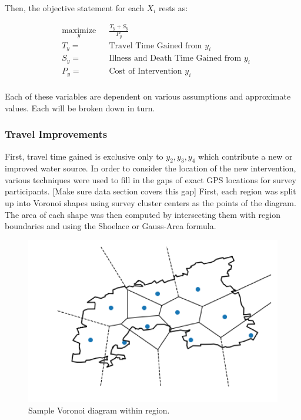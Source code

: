 Then, the objective statement for each $X_i$ rests as: %

\begin{equation}
\begin{aligned}
& \underset{y}{\text{maximize}}
& & \frac{T_y + S_y}{P_y}  \\
& T_y =
& & \text{Travel Time Gained from } y_i \\
& S_y =
& & \text{Illness and Death Time Gained from } y_i \\
& P_y =
& & \text{Cost of Intervention } y_i \\
\end{aligned}
\end{equation}

Each of these variables are dependent on various assumptions and approximate values.
Each will be broken down in turn.

\subsubsection*{Travel Improvements}
First, travel time gained is exclusive only to $y_2,y_3,y_4$ which contribute a new or improved water source.
In order to consider the location of the new intervention, various techniques were used to fill in the gaps of exact GPS locations for survey participants.
[Make sure data section covers this gap]
First, each region was split up into Voronoi shapes using survey cluster centers as the points of the diagram. %
The area of each shape was then computed by intersecting them with region boundaries and using the Shoelace or Gauss-Area formula. %

\begin{figure}[h]
    \includegraphics[width=\linewidth]{figures/voronoi.png}
    \caption{Sample Voronoi diagram within region.}
    \label{fig:voronoi}
\end{figure}

